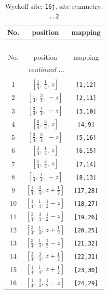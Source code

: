 \documentclass[fleqn,8pt]{jsarticle}
\begin{document}
\begin{longtable}{ccc}
\caption{Wyckoff site: {\tt 16j}, site symmetry: {\tt ..2}}
 \\
 \hline \hline
No. & position & mapping \\ \hline \endfirsthead

\multicolumn{2}{l}{\tablename\ \thetable{}} \\
 \hline \hline
No. & position & mapping \\ \hline \endhead

 \hline \hline
\multicolumn{2}{r}{\footnotesize\it continued ...} \\ \endfoot

 \hline \hline
\multicolumn{2}{r}{} \\ \endlastfoot

1 & $\left[ \frac{1}{4},\, \frac{1}{4},\, z \right]$ & {\tt [1,12]} \\ \hline
2 & $\left[ \frac{1}{4},\, \frac{3}{4},\, - z \right]$ & {\tt [2,11]} \\ \hline
3 & $\left[ \frac{3}{4},\, \frac{1}{4},\, - z \right]$ & {\tt [3,10]} \\ \hline
4 & $\left[ \frac{3}{4},\, \frac{3}{4},\, z \right]$ & {\tt [4,9]} \\ \hline
5 & $\left[ \frac{3}{4},\, \frac{3}{4},\, - z \right]$ & {\tt [5,16]} \\ \hline
6 & $\left[ \frac{3}{4},\, \frac{1}{4},\, z \right]$ & {\tt [6,15]} \\ \hline
7 & $\left[ \frac{1}{4},\, \frac{3}{4},\, z \right]$ & {\tt [7,14]} \\ \hline
8 & $\left[ \frac{1}{4},\, \frac{1}{4},\, - z \right]$ & {\tt [8,13]} \\ \hline
9 & $\left[ \frac{1}{4},\, \frac{3}{4},\, z + \frac{1}{2} \right]$ & {\tt [17,28]} \\ \hline
10 & $\left[ \frac{1}{4},\, \frac{1}{4},\, \frac{1}{2} - z \right]$ & {\tt [18,27]} \\ \hline
11 & $\left[ \frac{3}{4},\, \frac{3}{4},\, \frac{1}{2} - z \right]$ & {\tt [19,26]} \\ \hline
12 & $\left[ \frac{3}{4},\, \frac{1}{4},\, z + \frac{1}{2} \right]$ & {\tt [20,25]} \\ \hline
13 & $\left[ \frac{3}{4},\, \frac{1}{4},\, \frac{1}{2} - z \right]$ & {\tt [21,32]} \\ \hline
14 & $\left[ \frac{3}{4},\, \frac{3}{4},\, z + \frac{1}{2} \right]$ & {\tt [22,31]} \\ \hline
15 & $\left[ \frac{1}{4},\, \frac{1}{4},\, z + \frac{1}{2} \right]$ & {\tt [23,30]} \\ \hline
16 & $\left[ \frac{1}{4},\, \frac{3}{4},\, \frac{1}{2} - z \right]$ & {\tt [24,29]} \\
\end{longtable}
\end{document}
